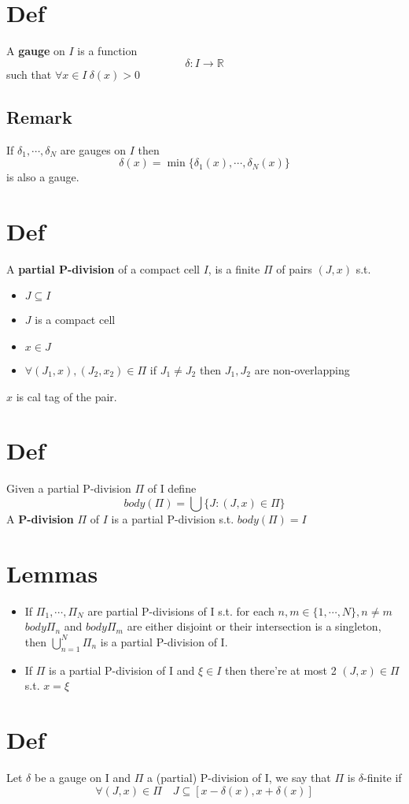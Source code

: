 \documentclass{book}
\begin{document}
\section{Def}
A \textbf{gauge} on $I$ is a function$$\delta:I\rightarrow\mathbb R$$such that $\forall x\in I\ \delta(x)>0$
\subsection*{Remark}
If $\delta_1,\cdots,\delta_N$ are gauges on $I$ then $$\delta(x)=\min\{\delta_1(x),\cdots,\delta_N(x)\}$$
is also a gauge.
\section{Def}
A \textbf{partial P-division} of a compact cell $I$, is a finite $\Pi$ of pairs $(J,x)$ s.t.
\begin{itemize}
    \item $J\subseteq I$
    \item $J$ is a compact cell
    \item $x\in J$
    \item $\forall (J_1,x),(J_2,x_2)\in \Pi$ if $J_1\neq J_2$ then $J_1,J_2$ are non-overlapping
\end{itemize} 
$x$ is cal tag of the pair.
\section{Def}
Given a partial P-division $\Pi$ of I define
$$body(\Pi)=\bigcup\{J:(J,x)\in\Pi\}$$
A \textbf{P-division} $\Pi$ of $I$ is a partial P-division s.t. $body(\Pi)=I$
\section{Lemmas}
\begin{itemize}
    \item If $\Pi_1,\cdots,\Pi_N$ are partial P-divisions of I s.t. for each $n,m\in \{1,\cdots,N\}, n\neq m $ $body \Pi_n$ and $body \Pi_m$ are either disjoint or their intersection is a singleton, then $\bigcup\limits_{n=1}^N\Pi_n$ is a partial P-division of I.
    \item If $\Pi$ is a partial P-division of I and $\xi\in I$ then there're at most 2 $(J,x)\in \Pi$ s.t. $x=\xi$
\end{itemize}
\section{Def}Let $\delta$ be a gauge on I and $\Pi$ a (partial) P-division of I, we say that $\Pi$ is $\delta$-finite if$$\forall(J,x)\in \Pi\quad J\subseteq[x-\delta(x),x+\delta(x)]$$
\end{document}
